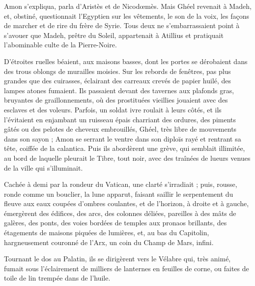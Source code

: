 \documentclass[a4paper, 11pt, oneside, polutonikogreek, french]{article}
\begin{document}
Amon s'expliqua, parla d'Aristès et de Nicodœmès. Mais Ghéel revenait à Madeh, et, obstiné, questionnait l'Egyptien sur les vêtements, le son de la voix, les façons de marcher et de rire du frère de Syrie. Tous deux ne s'embarrassaient point à s'avouer que Madeh, prêtre du Soleil, appartenait à Atillius et pratiquait l'abominable culte de la Pierre-Noire.

D'étroites ruelles béaient, aux maisons basses, dont les portes se dérobaient dans des trous oblongs de murailles moisies. Sur les rebords de fenêtres, pas plus grandes que des cuirasses, éclairant des carreaux crevés de papier huilé, des lampes atones fumaient. Ils passaient devant des tavernes aux plafonds gras, bruyantes de graillonnements, où des prostituées vieillies jouaient avec des esclaves et des voleurs. Parfois, un soldat ivre roulait à leurs côtés, et ils l'évitaient en enjambant un ruisseau épais charriant des ordures, des piments gâtés ou des pelotes de cheveux embrouillés, Ghéel, très libre de mouvements dans son sayon ; Amon se serrant le ventre dans son diploïs rayé et rentrant sa tête, coiffée de la calantica. Puis ils abordèrent une grève, qui semblait illimitée, au bord de laquelle pleurait le Tibre, tout noir, avec des traînées de lueurs venues de la ville qui s'illuminait.

Cachée à demi par la rondeur du Vatican, une clarté s'irradiait ; puis, rousse, ronde comme un bouclier, la lune apparut, faisant saillir le serpentement du fleuve aux eaux coupées d'ombres coulantes, et de l'horizon, à droite et à gauche, émergèrent des édifices, des arcs, des colonnes déliées, pareilles à des mâts de galères, des ponts, des voies bordées de temples aux pronaos brillants, des étagements de maisons piquées de lumières, et, au bas du Capitolin, hargneusement couronné de l'Arx, un coin du Champ de Mars, infini.

Tournant le dos au Palatin, ils se dirigèrent vers le Vélabre qui, très animé, fumait sous l'éclairement de milliers de lanternes en feuilles de corne, ou faites de toile de lin trempée dans de l'huile.
\end{document}
